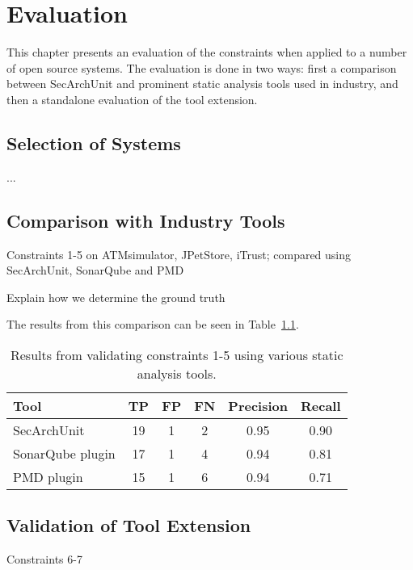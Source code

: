 \chapter{Evaluation}

This chapter presents an evaluation of the constraints when applied to a number of open source systems. The evaluation is done in two ways: first a comparison between SecArchUnit and prominent static analysis tools used in industry, and then a standalone evaluation of the tool extension.

\section{Selection of Systems}
...



\section{Comparison with Industry Tools}
Constraints 1-5 on ATMsimulator, JPetStore, iTrust; compared using SecArchUnit, SonarQube and PMD

Explain how we determine the ground truth

The results from this comparison can be seen in Table~\ref{tab:results_comparison}.

\begin{table}
\begin{center}
\begin{tabular}{lccccc}
\hline
\textbf{Tool} & \textbf{TP} & \textbf{FP} & \textbf{FN} & \textbf{Precision} & \textbf{Recall}\\
\hline
SecArchUnit & 19 & 1 & 2 & 0.95 & 0.90\\
\rowcolor{RowColor}
SonarQube plugin & 17 & 1 & 4 & 0.94 & 0.81\\
PMD plugin & 15 & 1 & 6 & 0.94 & 0.71\\
\hline
\end{tabular}
\end{center}
\caption{Results from validating constraints 1-5 using various static analysis tools.}
\label{tab:results_comparison}
\end{table}



\section{Validation of Tool Extension}
Constraints 6-7

